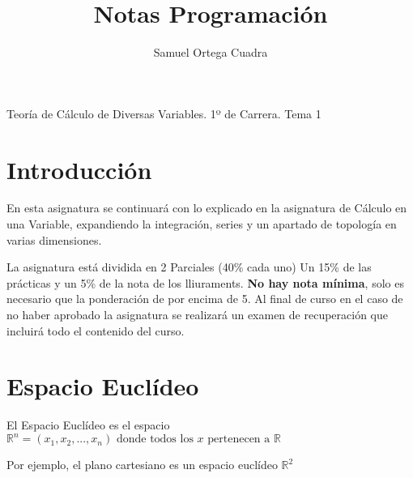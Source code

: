 \documentclass[11pt]{article}
\title{Notas Programación}
\author{Samuel Ortega Cuadra}
\theoremstyle{plain}
\begin{document}
    \begin{center}
        \huge{Teoría de Cálculo de Diversas Variables. 1º de Carrera. Tema 1}
    \end{center}
    \tableofcontents
    \newpage
    \section{Introducción} %
    \label{sec:introducción}
        En esta asignatura se continuará con lo explicado en la asignatura de Cálculo en una Variable, expandiendo la integración, series y un apartado de topología en varias dimensiones.

        La asignatura está dividida en 2 Parciales (40\% cada uno) Un 15\% de las prácticas y un 5\% de la nota de los lliuraments. \textbf{No hay nota mínima}, solo es necesario que la ponderación de por encima de 5. Al final de curso en el caso de no haber aprobado la asignatura se realizará un examen de recuperación que incluirá todo el contenido del curso. 
    \section{Espacio Euclídeo} %
    \label{sec:espacio_euclídeo}
        El Espacio Euclídeo es el espacio $\mathbb{R}^n = {(x_{1},x_{2},...,x_{n}) \text{ donde todos los $x$ pertenecen a } \mathbb{R}}$

        Por ejemplo, el plano cartesiano es un espacio euclídeo $\mathbb{R}^2$
\end{document}

